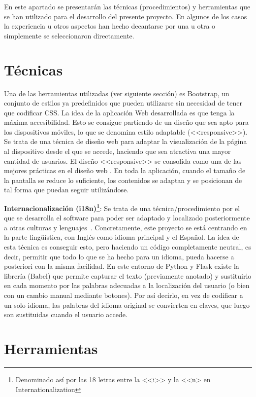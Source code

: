
En este apartado se presentarán las técnicas (procedimientos) y herramientas que
se han utilizado para el desarrollo del presente proyecto. En algunos de los
casos la experiencia u otros aspectos han hecho decantarse por una u otra o
simplemente se seleccionaron directamente.

\section{Técnicas}

Una de las herramientas utilizadas (ver siguiente sección) es Bootstrap, un
conjunto de estilos ya predefinidos que pueden utilizarse sin necesidad de tener
que codificar CSS. La idea de la aplicación Web desarrollada es que tenga la
máxima accesibilidad. Esto se consigue partiendo de un diseño que sea apto para
los dispositivos móviles, lo que se denomina estilo adaptable (<<responsive>>).
Se trata de una técnica de diseño web para adaptar la visualización de la página
al dispositivo desde el que se accede, haciendo que sea atractiva una mayor
cantidad de usuarios. El diseño <<responsive>> se consolida como una de las
mejores prácticas en el diseño web \cite{40defiebre}. En toda la aplicación,
cuando el tamaño de la pantalla se reduce lo suficiente, los contenidos se
adaptan y se posicionan de tal forma que puedan seguir utilizándose.

\textbf{Internacionalización (i18n)\footnote{Denominado así por las 18 letras
entre la <<i>> y la <<n> en Internationalization}}: Se trata de una
técnica/procedimiento por el que se desarrolla el software para poder ser
adaptado y localizado posteriormente a otras culturas y
lenguajes~\cite{lokalise}. Concretamente, este proyecto se está centrando en la
parte lingüística, con Inglés como idioma principal y el Español. La idea de
esta técnica es conseguir esto, pero haciendo un código completamente neutral,
es decir, permitir que todo lo que se ha hecho para un idioma, pueda hacerse a
posteriori con la misma facilidad. En este entorno de Python y Flask existe la
librería (Babel) que permite capturar el texto (previamente anotado) y
sustituirlo en cada momento por las palabras adecuadas a la localización del
usuario (o bien con un cambio manual mediante botones). Por así decirlo, en vez
de codificar a un solo idioma, las palabras del idioma original se convierten en
claves, que luego son sustituidas cuando el usuario accede.


\section{Herramientas}

